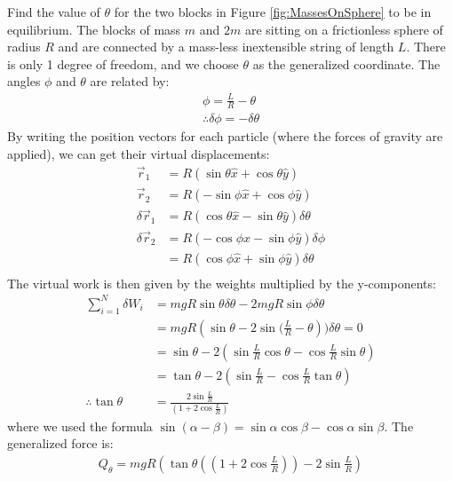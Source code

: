 \begin{example}{0pt}{Find the value of $\theta$ for the two blocks in Figure \ref{fig:MassesOnSphere} to be in equilibrium. The blocks of mass $m$ and $2m$ are sitting on a frictionless sphere of radius $R$ and are connected by a mass-less inextensible string of length $L$.}{}
There is only 1 degree of freedom, and we choose $\theta$ as the generalized coordinate. The angles $\phi$ and $\theta$ are related by:
\begin{align*}
\phi=\frac{L}{R}-\theta\\
\therefore \delta\phi = -\delta \theta
\end{align*}
By writing the position vectors for each particle (where the forces of gravity are applied), we can get their virtual displacements:
\begin{align*}
\vec{r}_1&=R(\sin{\theta}\hat{x}+\cos{\theta}\hat{y})\\
\vec{r}_2&=R(-\sin{\phi}\hat{x}+\cos{\phi}\hat{y})\\
\delta\vec{r}_1&=R(\cos{\theta}\hat{x}-\sin{\theta}\hat{y})\delta\theta\\
\delta\vec{r}_2&=R(-\cos{\phi}\hat{x}-\sin{\phi}\hat{y})\delta\phi\\
&=R(\cos{\phi}\hat{x}+\sin{\phi}\hat{y})\delta\theta\\
\end{align*}
The virtual work is then given by the weights multiplied by the y-components:
\begin{align*}
\sum_{i=1}^N\delta W_i&=mgR\sin{\theta}\delta\theta-2mgR\sin{\phi}\delta\theta\\
&=mgR(\sin{\theta}-2\sin{(\frac{L}{R}-\theta}))\delta\theta=0\\
&=\sin{\theta}-2(\sin{\frac{L}{R}}\cos{\theta}-\cos{\frac{L}{R}}\sin{\theta})\\
&=\tan{\theta}-2(\sin{\frac{L}{R}}-\cos{\frac{L}{R}}\tan{\theta})\\
\therefore\tan{\theta}&=\frac{2\sin{\frac{L}{R}}}{(1+2\cos{\frac{L}{R}})}
\end{align*}
where we used the formula $\sin{(\alpha-\beta)}=\sin\alpha\cos\beta -\cos\alpha\sin\beta$. The generalized force is:
\begin{align*}
Q_\theta=mgR\left(\tan{\theta}((1+2\cos{\frac{L}{R}}))-2 \sin{\frac{L}{R}} \right)
\end{align*}
\end{example}

